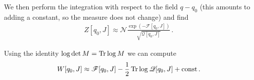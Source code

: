 \documentclass[main.tex]{subfiles}
\begin{document}

We then perform the integration with respect to the field \(q - q_0 \) (this amounts to adding a constant, so the measure does not change) and find 
%
\begin{align}
Z[q_0 , J] \approx \mathscr{N}\frac{\exp(- \mathscr{F}[q_0, J ])}{\sqrt{\mathscr{Q} [q_0, J]}}
\,.
\end{align}

Using the identity \(\log \det M = \Tr \log M\) we can compute 
%
\begin{align}
W[q_0 , J] \approx \mathscr{F}[q_0 , J] - \frac{1}{2} \Tr \log \mathscr{Q}[q_0, J] + \text{const}
\,.
\end{align}
\end{document}
